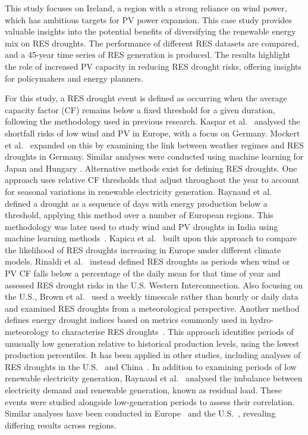 \documentclass[preprint, 12pt]{elsarticle}
\begin{document}
This study focuses on Ireland, a region with a strong reliance on wind power, which has ambitious targets for PV power expansion. This case study provides valuable insights into the potential benefits of diversifying the renewable energy mix on RES droughts. The performance of different RES datasets are compared, and a 45-year time series of RES generation is produced. The results highlight the role of increased PV capacity in reducing RES drought risks, offering insights for policymakers and energy planners.

For this study, a RES drought event is defined as occurring when the average capacity factor (CF) remains below a fixed threshold for a given duration, following the methodology used in previous research. Kaspar et al.~\citep{kaspar2019drought} analysed the shortfall risks of low wind and PV in Europe, with a focus on Germany. Mockert et al.~\citep{mockert2023drought} expanded on this by examining the link between weather regimes and RES droughts in Germany. Similar analyses were conducted using machine learning for Japan \citep{ohba2022drought} and Hungary \citep{mayer2023drought}. Alternative methods exist for defining RES droughts. One approach uses relative CF thresholds that adjust throughout the year to account for seasonal variations in renewable electricity generation. Raynaud et al.~\citep{raynaud2018drought} defined a drought as a sequence of days with energy production below a threshold, applying this method over a number of European regions. This methodology was later used to study wind and PV droughts in India using machine learning methods~\citep{gangopadhyay2022drought}. Kapica et al.~\citep{kapica2024drought} built upon this approach to compare the likelihood of RES droughts increasing in Europe under different climate models. Rinaldi et al.~\citep{rinaldi2021drought} instead defined RES droughts as periods when wind or PV CF falls below a percentage of the daily mean for that time of year and assessed RES drought risks in the U.S. Western Interconnection. Also focusing on the U.S., Brown et al.~\citep{brown2021drought} used a weekly timescale rather than hourly or daily data and examined RES droughts from a meteorological perspective. Another method defines energy drought indices based on metrics commonly used in hydro-meteorology to characterise RES droughts~\citep{allen2023drought}. This approach identifies periods of unusually low generation relative to historical production levels, using the lowest production percentiles. It has been applied in other studies, including analyses of RES droughts in the U.S.~\citep{bracken2024drought} and China~\citep{lei2024drought}. In addition to examining periods of low renewable electricity generation, Raynaud et al.~\citep{raynaud2018drought} analysed the imbalance between electricity demand and renewable generation, known as residual load. These events were studied alongside low-generation periods to assess their correlation. Similar analyses have been conducted in Europe~\citep{allen2023drought} and the U.S.~\citep{bracken2024drought}, revealing differing results across regions.
\end{document}
